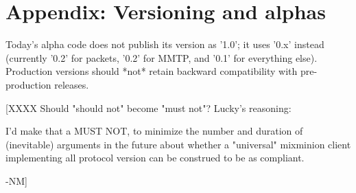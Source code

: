 \section{Appendix: Versioning and alphas}

Today's alpha code does not publish its version as '1.0'; it uses
'0.x' instead (currently '0.2' for packets, '0.2' for MMTP, and '0.1'
for everything else).  Production versions should *not* retain
backward compatibility with pre-production releases.

[XXXX Should "should not" become "must not"?  Lucky's reasoning:

       I'd make that a MUST NOT, to minimize the number and duration
       of (inevitable) arguments in the future about whether a
       "universal" mixminion client implementing all protocol version
       can be construed to be as compliant.

-NM]
